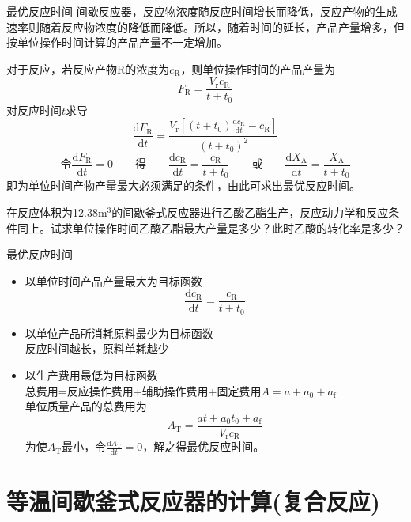 \documentclass[dvipsnames, svgnames, x11names]{beamer}
\begin{document}
\begin{frame}{最优反应时间}
    间歇反应器，反应物浓度随反应时间增长而降低，反应产物的生成速率则随着反应物浓度的降低而降低。所以，随着时间的延长，产品产量增多，但按单位操作时间计算的产品产量不一定增加。
    
    对于反应，若反应产物R的浓度为$c_\mathrm{R}$，则单位操作时间的产品产量为
    $$F_{\mathrm{R}}=\frac{V_{\mathrm{r}} c_{\mathrm{R}}}{t+t_{0}}$$
    对反应时间$t$求导
    $$\frac{\mathrm{d} F_{\mathrm{R}}}{\mathrm{d} t}=\frac{V_{\mathrm{r}}\left[(t+t_{0}) \frac{\mathrm{d} c_{\mathrm{R}}}{\mathrm{d} t}-c_{\mathrm{R}}\right]}{\left(t+t_{0}\right)^{2}}$$
    $$\text{令}\frac{\mathrm{d} F_{\mathrm{R}}}{\mathrm{d} t}=0 \qquad\text{得}\qquad \frac{\mathrm{d} c_{\mathrm{R}}}{\mathrm{d} t}=\frac{c_{\mathrm{R}}}{t+t_{0}}\qquad\text{或}\qquad \frac{\mathrm{d} X_{\mathrm{A}}}{\mathrm{d} t}=\frac{X_{\mathrm{A}}}{t+t_{0}}$$
    即为单位时间产物产量最大必须满足的条件，由此可求出最优反应时间。
\end{frame}


\begin{frame}[t]{}
    \begin{example}
        在反应体积为12.38m$^3$的间歇釜式反应器进行乙酸乙酯生产，反应动力学和反应条件同上。试求单位操作时间乙酸乙酯最大产量是多少？此时乙酸的转化率是多少？
    \end{example}
\end{frame}

\begin{frame}{最优反应时间}
    \begin{itemize}
        \item 以单位时间产品产量最大为目标函数 $$\frac{\mathrm{d} c_{\mathrm{R}}}{\mathrm{d} t}=\frac{c_{\mathrm{R}}}{t+t_{0}}$$
        \item 以单位产品所消耗原料最少为目标函数\\\qquad 反应时间越长，原料单耗越少
        \item 以生产费用最低为目标函数\\\qquad 总费用=反应操作费用+辅助操作费用+固定费用$A=a+a_0+a_\mathrm{f}$\\\qquad 单位质量产品的总费用为$$A_{\mathrm{T}}=\frac{a t+a_{0} t_{0}+a_{\mathrm{f}}}{V_{\mathrm{r}} c_{\mathrm{R}}}$$\qquad 为使$A_{\mathrm{T}}$最小，令$\frac{\mathrm{d} A_{\mathrm{T}}}{\mathrm{d} t}=0$，解之得最优反应时间。
    \end{itemize}
\end{frame}


\section{等温间歇釜式反应器的计算(复合反应)}
\end{document}
